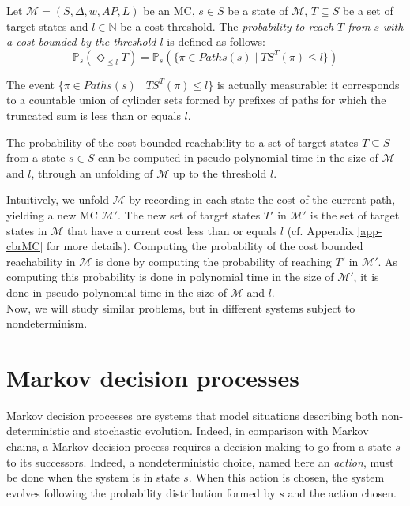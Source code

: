\begin{definition}
	Let $\mathcal{M} = (S, \Delta, w, AP, L)$ be an MC, $s \in S$ be a state of $\mathcal{M}$, $T \subseteq S$ be a set of target states and $l \in \mathbb{N}$ be a cost threshold.
  The \textit{probability to reach $T$ from $s$ with a cost bounded by the threshold $l$} is defined as follows:
	\[
    \mathbb{P}_s(\Diamond_{\leq l} T) = \mathbb{P}_s(\{\pi \in Paths(s) \; | \; TS^T(\pi) \leq l \})
  \]
\end{definition}
The event $\{\pi \in Paths(s) \; | \; TS^T(\pi) \leq l \}$ is actually measurable: it corresponds to a countable union of cylinder sets formed by prefixes of paths for which the truncated sum is less than or equals $l$.%
\begin{theorem}
  The probability of the cost bounded reachability to a set of target states $T \subseteq S$ from a state $s \in S$ can be computed in pseudo-polynomial time in the size of $\mathcal{M}$ and $l$, through an unfolding of $\mathcal{M}$ up to the threshold $l$.
\end{theorem}

Intuitively, we unfold $\mathcal{M}$ by recording in each state the cost of the
current path, yielding a new MC $\mathcal{M}'$. The new set of target states $T'$ in $\mathcal{M}'$ is the set of
target states in $\mathcal{M}$ that have a current cost less than or equals $l$ (cf.
Appendix \ref{app-cbrMC} for more details).
Computing the probability of the cost bounded reachability in $\mathcal{M}$ is done by computing the probability of reaching $T'$ in $\mathcal{M}'$.
As computing this probability is done in polynomial time in the size of $\mathcal{M}'$, it is done in pseudo-polynomial time in the size of $\mathcal{M}$ and $l$.
\\

Now, we will study similar problems, but in different systems subject to nondeterminism.

\section{Markov decision processes}
Markov decision processes are systems that model situations describing both non-deterministic and stochastic evolution.
Indeed, in comparison with Markov chains, a Markov decision process requires a decision making to go from a state $s$ to its successors.
Indeed, a nondeterministic choice, named here an \textit{action}, must be done when the system is in state $s$.
When this action is chosen, the system evolves following the probability distribution formed by $s$ and the action chosen.

